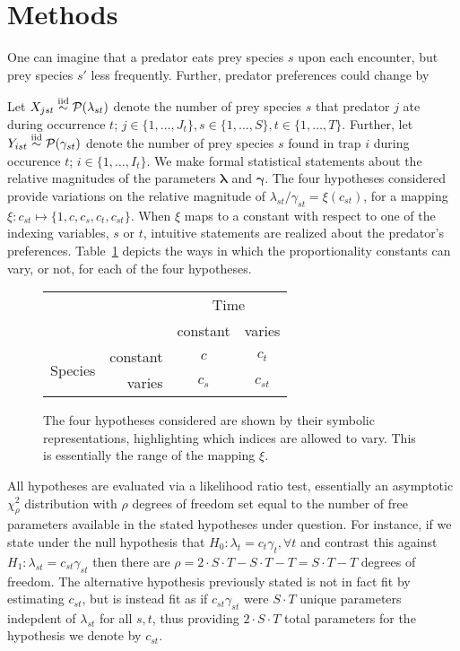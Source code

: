 \section*{Methods}
\label{sec:methods}

One can imagine that a predator eats prey species $s$ upon each encounter, but prey species $s'$ less frequently.  Further, predator preferences could change by 

Let $X_{jst} \stackrel{\mathrm{iid}}{\sim} \mathcal{P}(\lambda_{st})$ denote the number of prey species $s$ that predator $j$ ate during occurrence $t$; $j \in \{1, \ldots, J_t\}, s \in \{1, \ldots, S\}, t \in \{1, \ldots, T\}$.  Further, let $Y_{ist} \stackrel{\mathrm{iid}}{\sim} \mathcal{P}(\gamma_{st})$ denote the number of prey species $s$ found in trap $i$ during occurence $t$; $i \in \{1, \ldots, I_t\}$.  We make formal statistical statements about the relative magnitudes of the parameters $\boldsymbol{\lambda}$ and $\boldsymbol{\gamma}$.  The four hypotheses considered provide variations on the relative magnitude of $\lambda_{st}/\gamma_{st} = \xi(c_{st})$, for a mapping $\xi: c_{st} \mapsto \{1, c, c_s, c_t, c_{st}\}$.  When $\xi$ maps to a constant with respect to one of the indexing variables, $s$ or $t$, intuitive statements are realized about the predator's preferences.  Table~\ref{tab:hyp} depicts the ways in which the proportionality constants can vary, or not, for each of the four hypotheses.

\begin{figure}[h]
  \centering
  \begin{tabular}{rrcc}
    & & \multicolumn{2}{c}{Time} \\
    & & constant & varies \\
    \cline{3-4}
    \multirow{2}{*}{Species} & \multicolumn{1}{r|}{constant} & \multicolumn{1}{c}{$c$} & \multicolumn{1}{|c|}{$c_t$} \\ 
    \cline{3-4}
    & \multicolumn{1}{r|}{varies} & \multicolumn{1}{c}{$c_s$} & \multicolumn{1}{|c|}{$c_{st}$} \\
    \cline{3-4}
  \end{tabular}
  \caption{The four hypotheses considered are shown by their symbolic representations, highlighting which indices are allowed to vary.  This is essentially the range of the mapping $\xi$.  }
  \label{tab:hyp}
\end{figure}

All hypotheses are evaluated via a likelihood ratio test, essentially an asymptotic $\chi_{\rho}^2$ distribution with $\rho$ degrees of freedom set equal to the number of free parameters available in the stated hypotheses under question.  For instance, if we state under the null hypothesis that $H_0: \lambda_t = c_t \gamma_t, \forall t$ and contrast this against $H_1: \lambda_{st} = c_{st}\gamma_{st}$ then there are $\rho = 2 \cdot S \cdot T - S \cdot T - T = S \cdot T - T$ degrees of freedom.  The alternative hypothesis previously stated is not in fact fit by estimating $c_{st}$, but is instead fit as if $c_{st}\gamma_{st}$ were $S \cdot T$ unique parameters indepdent of $\lambda_{st}$ for all $s,t$, thus providing $2 \cdot S \cdot T$ total parameters for the hypothesis we denote by $c_{st}$.  

